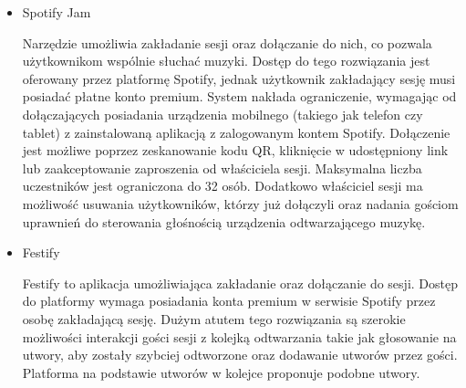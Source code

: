 \begin{itemize}
\item Spotify Jam \cite{bib:spotify_jam}

Narzędzie umożliwia zakładanie sesji oraz dołączanie do nich, co pozwala użytkownikom wspólnie słuchać muzyki. Dostęp do tego rozwiązania jest oferowany przez platformę Spotify, jednak użytkownik zakładający sesję musi posiadać płatne konto premium. System nakłada ograniczenie, wymagając od dołączających posiadania urządzenia mobilnego (takiego jak telefon czy tablet) z zainstalowaną aplikacją z zalogowanym kontem Spotify. Dołączenie jest możliwe poprzez zeskanowanie kodu QR, kliknięcie w udostępniony link lub zaakceptowanie zaproszenia od właściciela sesji. Maksymalna liczba uczestników jest ograniczona do 32 osób. Dodatkowo właściciel sesji ma możliwość usuwania użytkowników, którzy już dołączyli oraz nadania gościom uprawnień do sterowania głośnością urządzenia odtwarzającego muzykę.

\item Festify \cite{bib:festify}

Festify to aplikacja umożliwiająca zakładanie oraz dołączanie do sesji. Dostęp do platformy wymaga posiadania konta premium w serwisie Spotify przez osobę zakładającą sesję. Dużym atutem tego rozwiązania są szerokie możliwości interakcji gości sesji z kolejką odtwarzania takie jak głosowanie na utwory, aby zostały szybciej odtworzone oraz dodawanie utworów przez gości. Platforma na podstawie utworów w kolejce proponuje podobne utwory.

\end{itemize}


